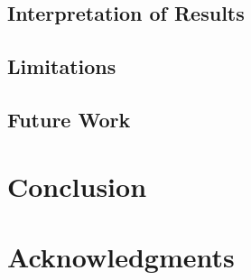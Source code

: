 \documentclass[11pt,a4paper]{article}
\begin{document}

\subsection{Interpretation of Results}
\label{subsec:interpretation}


\subsection{Limitations}
\label{subsec:limitations}


\subsection{Future Work}
\label{subsec:future_work}


\section{Conclusion}
\label{sec:conclusion}



\section*{Acknowledgments}

\end{document}
